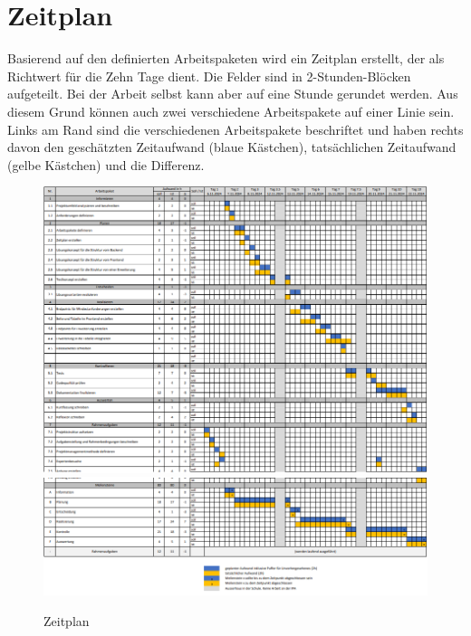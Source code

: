 \chapter{Zeitplan}\label{ch:zeitplan}
Basierend auf den definierten Arbeitspaketen wird ein Zeitplan erstellt, der als Richtwert für die Zehn Tage dient. Die Felder sind in 2-Stunden-Blöcken aufgeteilt. Bei der Arbeit selbst kann aber auf eine Stunde gerundet werden. Aus diesem Grund können auch zwei verschiedene Arbeitspakete auf einer Linie sein. Links am Rand sind die verschiedenen Arbeitspakete beschriftet und haben rechts davon den geschätzten Zeitaufwand (blaue Kästchen), tatsächlichen Zeitaufwand (gelbe Kästchen) und die Differenz.


\begin{figure}[H]
	\begin{center}
		\includegraphics[width=\textwidth]{ressourcen/zeitplan1}
		\includegraphics[width=\textwidth]{ressourcen/zeitplan2}
		\caption[Zeitplan]{Zeitplan}\label{fig:zeitplan1}
	\end{center}
\end{figure}

